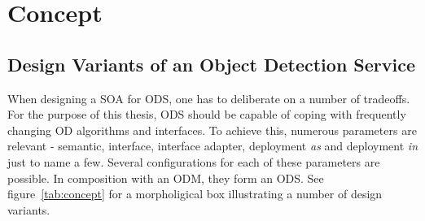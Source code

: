 \chapter{Concept\label{cha:chapter4}}
\section{Design Variants of an Object Detection Service}
\label{sec:concecptOverview}
When designing a SOA for ODS, one has to deliberate on a number of tradeoffs. For the purpose of this thesis, ODS should be capable of coping with frequently changing OD algorithms and interfaces. To achieve this, numerous parameters are relevant - semantic, interface, interface adapter, deployment \textit{as} and deployment \textit{in} just to name a few. Several configurations for each of these parameters are possible. In composition with an ODM, they form an ODS. See figure~\ref{tab:concept} for a morpholigical box illustrating a number of design variants.

